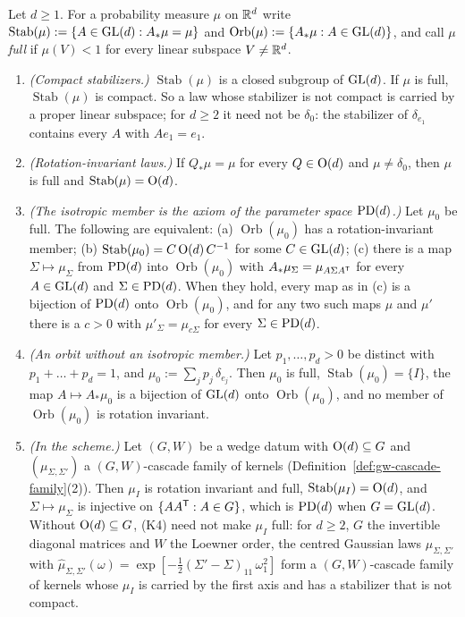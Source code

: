 \begin{lemma}\label{lem:parameter-space}
Let $d \ge 1$. For a probability measure $\mu$ on $\mathbb{R}^d$ write
$\operatorname{Stab}(\mu) := \{A \in \mathrm{GL}(d) : A_*\mu = \mu\}$ and
$\operatorname{Orb}(\mu) := \{A_*\mu : A \in \mathrm{GL}(d)\}$, and call $\mu$ \emph{full} if
$\mu(V) < 1$ for every linear subspace $V \ne \mathbb{R}^d$.
\begin{enumerate}
\item \emph{(Compact stabilizers.)} $\operatorname{Stab}(\mu)$ is a closed subgroup of $\mathrm{GL}(d)$. If
$\mu$ is full, $\operatorname{Stab}(\mu)$ is compact. So a law whose stabilizer is not compact is
carried by a proper linear subspace; for $d \ge 2$ it need not be $\delta_0$: the stabilizer of
$\delta_{e_1}$ contains every $A$ with $Ae_1 = e_1$.
\item \emph{(Rotation-invariant laws.)} If $Q_*\mu = \mu$ for every $Q \in \mathrm{O}(d)$ and
$\mu \ne \delta_0$, then $\mu$ is full and $\operatorname{Stab}(\mu) = \mathrm{O}(d)$.
\item \emph{(The isotropic member is the axiom of the parameter space $\mathrm{PD}(d)$.)} Let $\mu_0$ be
full. The following are equivalent:
(a) $\operatorname{Orb}(\mu_0)$ has a rotation-invariant member;
(b) $\operatorname{Stab}(\mu_0) = C\,\mathrm{O}(d)\,C^{-1}$ for some $C \in \mathrm{GL}(d)$;
(c) there is a map $\Sigma \mapsto \mu_\Sigma$ from $\mathrm{PD}(d)$ into $\operatorname{Orb}(\mu_0)$ with
$A_*\mu_\Sigma = \mu_{A\Sigma A^{\mathsf{T}}}$ for every $A \in \mathrm{GL}(d)$ and $\Sigma \in \mathrm{PD}(d)$.
When they hold, every map as in (c) is a bijection of $\mathrm{PD}(d)$ onto $\operatorname{Orb}(\mu_0)$, and
for any two such maps $\mu$ and $\mu'$ there is a $c > 0$ with $\mu'_\Sigma = \mu_{c\Sigma}$ for
every $\Sigma \in \mathrm{PD}(d)$.
\item \emph{(An orbit without an isotropic member.)} Let $p_1, \dots, p_d > 0$ be distinct with
$p_1 + \dots + p_d = 1$, and $\mu_0 := \sum_jp_j\,\delta_{e_j}$. Then $\mu_0$ is full,
$\operatorname{Stab}(\mu_0) = \{I\}$, the map $A \mapsto A_*\mu_0$ is a bijection of $\mathrm{GL}(d)$ onto
$\operatorname{Orb}(\mu_0)$, and no member of $\operatorname{Orb}(\mu_0)$ is rotation invariant.
\item \emph{(In the scheme.)} Let $(G, W)$ be a wedge datum with $\mathrm{O}(d) \subseteq G$ and
$(\mu_{\Sigma,\Sigma'})$ a $(G, W)$-cascade family of kernels (Definition~\ref{def:gw-cascade-family}(2)). Then
$\mu_I$ is rotation invariant and full, $\operatorname{Stab}(\mu_I) = \mathrm{O}(d)$, and
$\Sigma \mapsto \mu_\Sigma$ is injective on $\{AA^{\mathsf{T}} : A \in G\}$, which is $\mathrm{PD}(d)$ when
$G = \mathrm{GL}(d)$. Without $\mathrm{O}(d) \subseteq G$, (K4) need not make $\mu_I$ full: for $d \ge 2$, $G$
the invertible diagonal matrices and $W$ the Loewner order, the centred Gaussian laws
$\mu_{\Sigma,\Sigma'}$ with $\widehat\mu_{\Sigma,\Sigma'}(\omega) =
\exp[-\tfrac12(\Sigma' - \Sigma)_{11}\,\omega_1^2]$ form a $(G, W)$-cascade family of kernels whose
$\mu_I$ is carried by the first axis and has a stabilizer that is not compact.
\end{enumerate}
\end{lemma}

